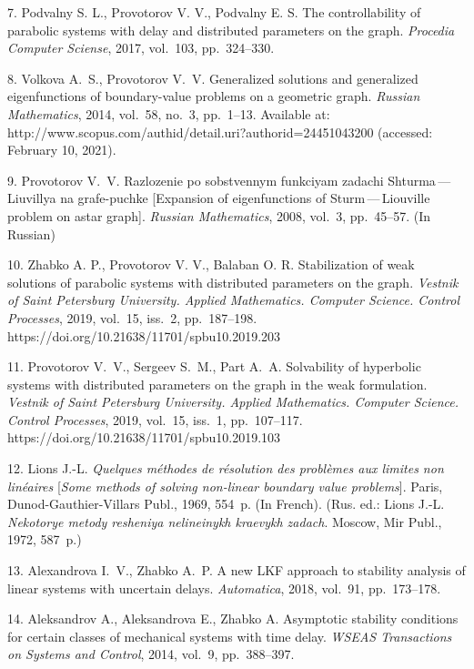 {7. Podvalny S. L., Provotorov V. V., Podvalny E. S.  The controllability of parabolic systems with delay and distributed parameters on the graph. \emph{Procedia Computer Sciense}, 2017, vol.~103, pp.~324--330.


8. Volkova A.~S., Provotorov V.~V.  Generalized solutions and generalized eigenfunctions of boundary-value problems on a geometric graph. \emph{Russian Mathematics}, 2014, vol.~58, no.~3,  pp.~1--13.  Available at: http://www.scopus.com/authid/detail.uri?authorid=24451043200 (accessed: February 10, 2021).

9. Provotorov V.~V. Razlozenie po sobstvennym funkciyam zadachi Shturma\,---\,Liuvillya na grafe-puchke [Expansion  of eigenfunctions of Sturm\,---\,Liouville problem on astar graph]. \emph{Russian Mathematics}, 2008, vol.~3, pp.~45--57. (In Russian)

10. Zhabko A. P.,  Provotorov V. V., Balaban O. R.  Stabilization of weak solutions of pa\-ra\-bo\-lic systems with distributed parameters on the graph. \emph{Vestnik of Saint Petersburg University. Applied Mathematics. Computer Science. Control Processes}, 2019, vol.~15, iss.~2, pp.~187--198.\\ https://doi.org/10.21638/11701/spbu10.2019.203

11. Provotorov V.~V., Sergeev S.~M., Part A.~A. Solvability of hyperbolic systems with dis\-tri\-bu\-ted parameters on the graph in the weak formulation. \emph{Vestnik of Saint Petersburg University. Applied Mathematics. Computer Science. Control Processes}, 2019, vol.~15, iss.~1, pp.~107--117.\\
https://doi.org/10.21638/11701/spbu10.2019.103


12. Lions J.-L. \textit{Quelques m\'{e}thodes de r\'{e}solution des probl\`{e}mes aux limites non lin\'{e}aires} [\textit{Some methods of solving non-linear boundary value problems}]. Paris, Dunod-Gauthier-Villars Publ., 1969, 554~p. (In French). (Rus. ed.: Lions J.-L. \textit{Nekotorye metody resheniya nelineinykh kraevykh zadach}. Moscow, Mir Publ., 1972, 587~p.)

13. Alexandrova I.~V., Zhabko A.~P.  A new LKF approach to stability analysis of linear systems with uncertain delays. \emph{Automatica}, 2018, vol.~91, pp.~173--178.

14. Aleksandrov A., Aleksandrova E., Zhabko A. Asymptotic stability conditions for certain classes of mechanical systems with time delay. \emph{WSEAS Transactions on Systems and Control}, 2014, vol.~9, pp.~388--397.

}
